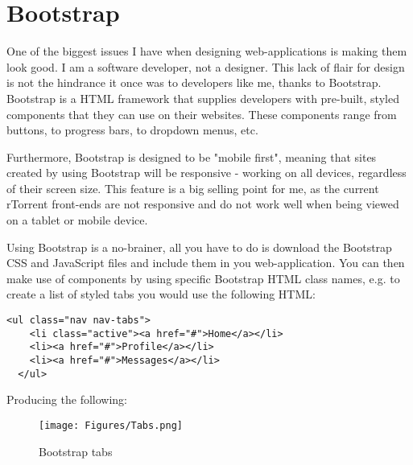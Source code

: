 
\section{Bootstrap}
One of the biggest issues I have when designing web-applications is making them look good. I am a software developer, not a designer. This lack of flair for design is not the hindrance it once was to developers like me, thanks to Bootstrap. Bootstrap is a HTML framework that supplies developers with pre-built, styled components that they can use on their websites. These components range from buttons, to progress bars, to dropdown menus, etc.

Furthermore, Bootstrap is designed to be "mobile first", meaning that sites created by using Bootstrap will be responsive - working on all devices, regardless of their screen size. This feature is a big selling point for me, as the current rTorrent front-ends are not responsive and do not work well when being viewed on a tablet or mobile device.

Using Bootstrap is a no-brainer, all you have to do is download the Bootstrap CSS and JavaScript files and include them in you web-application. You can then make use of components by using specific Bootstrap HTML class names, e.g. to create a list of styled tabs you would use the following HTML:

\vspace{20px}
\begin{lstlisting}[caption=Bootstrap tabs HTML code]
  <ul class="nav nav-tabs">
    <li class="active"><a href="#">Home</a></li>
    <li><a href="#">Profile</a></li>
    <li><a href="#">Messages</a></li>
  </ul>
\end{lstlisting}


Producing the following: 

\begin{figure}[h!]
  \centering
    \texttt{[image: Figures/Tabs.png]}
  \caption{Bootstrap tabs}
\end{figure}














